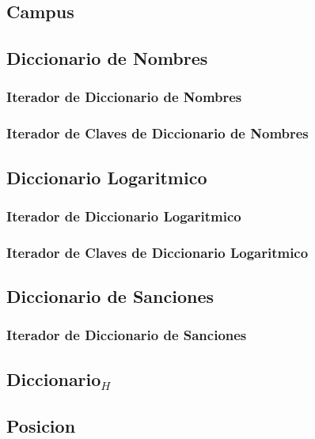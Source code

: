 \documentclass[a4paper,10pt, nofootinbib]{article}
\begin{document}
\subsection{Campus}


\subsection{Diccionario de Nombres}

\subsubsection{Iterador de Diccionario de Nombres}

\subsubsection{Iterador de Claves de Diccionario de Nombres}



\subsection{Diccionario Logaritmico}

\subsubsection{Iterador de Diccionario Logaritmico}
%
\subsubsection{Iterador de Claves de Diccionario Logaritmico}



\subsection{Diccionario de Sanciones}

\subsubsection{Iterador de Diccionario de Sanciones}


\subsection{Diccionario$_H$}


\subsection{Posicion}

\end{document}
